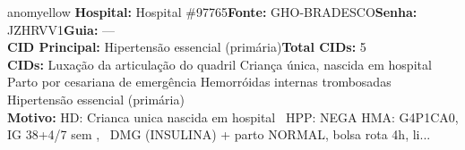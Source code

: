 \documentclass[a4paper,10pt]{article}
\begin{document}
\begin{anomalycard}[Interna\c{c}\~{a}o \#118033 | Pac. \#97942 | MODERADO (z=2.00) | LOS: 4d | 22/02/2026\,$\to$\,26/02/2026]{anomyellow}
\textbf{Hospital:} Hospital \#97765\quad \textbf{Fonte:} GHO-BRADESCO\quad \textbf{Senha:} JZHRVV1\quad \textbf{Guia:} ---\\

\textbf{CID Principal:} {\small Hipertensão essencial (primária)}\quad\textbf{Total CIDs:} 5\\

\textbf{CIDs:} {\scriptsize Luxação da articulação do quadril \textbar{} Criança única, nascida em hospital \textbar{} Parto por cesariana de emergência \textbar{} Hemorróidas internas trombosadas \textbar{} Hipertensão essencial (primária)}\\

\textbf{Motivo:} {\scriptsize HD: Crianca unica nascida em hospital  HPP: NEGA HMA: G4P1CA0, IG 38+4/7 sem ,  DMG (INSULINA) + parto NORMAL, bolsa rota 4h, li...}\\




\end{anomalycard}
\end{document}
